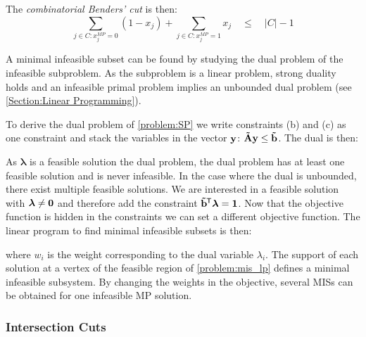 The \textit{combinatorial Benders' cut} is then: 
\begin{equation*}
    \sum_{j \in C: x_j^{MP}=0} (1 - x_{j}) + \sum_{j \in C: x_j^{MP}=1} x_j \quad \leq \quad |C| -1
\end{equation*}

A minimal infeasible subset can be found by studying the dual problem of the infeasible subproblem. As the subproblem is a linear problem, strong duality holds and an infeasible primal problem implies an unbounded dual problem (see \cref{Section:Linear Programming}).

To derive the dual problem of \cref{problem:SP} we write constraints (b) and (c) as one constraint and stack the variables in the vector $\bold y$: $\bold{\tilde A} \bold y \leq \bold{\tilde b}$. The dual is then:
\begin{maxi!}
    {\scriptstyle \boldsymbol \lambda}{ \tran \boldsymbol \lambda}{}{}
\end{maxi!}
As $\boldsymbol \lambda$ is a feasible solution the dual problem, the dual problem has at least one feasible solution and is never infeasible. In the case where the dual is unbounded, there exist multiple feasible solutions. We are interested in a feasible solution with $\boldsymbol \lambda \neq \bold 0$ and therefore add the constraint $\bold{\tilde b} ^{\mkern-1.5mu\mathsf{T}} \boldsymbol \lambda = \bold 1$. Now that the objective function is hidden in the constraints we can set a different objective function.
The linear program to find minimal infeasible subsets is then:
where $w_i$ is the weight corresponding to the dual variable $\lambda_i$. The support of each solution at a vertex of the feasible region of \cref{problem:mis_lp}  defines a minimal infeasible subsystem. By changing the weights in the objective, several MISs can be obtained for one infeasible MP solution. \cite{codato_combinatorial_2006}


\subsubsection{Intersection Cuts} \label{Section:intersection_cuts}


